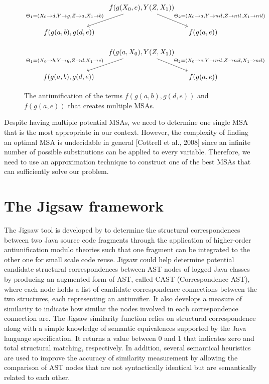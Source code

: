 \begin{figure} [H]
\[
\begin{tikzcd}[column sep=small]
&
  f(g(X_0,e),Y(Z,X_1))
  \arrow{dr}{\Theta_2 = ( X_0 \rightarrow a, Y \rightarrow nil, Z \rightarrow nil, X_1 \rightarrow nil) }
  \arrow[->,swap]{dl}{\Theta_1 = ( X_0 \rightarrow d, Y \rightarrow g, Z \rightarrow a, X_1 \rightarrow b)} %
\\
f(g(a,b), g(d,e))
&&
f(g(a,e))
\end{tikzcd}
\]	

\[
\begin{tikzcd}[column sep=small]
&
  f(g(a,X_0),Y(Z,X_1))
  \arrow{dr}{\Theta_2 = ( X_0 \rightarrow e, Y \rightarrow nil, Z \rightarrow nil, X_1 \rightarrow nil) }
  \arrow[->,swap]{dl}{\Theta_1 = ( X_0 \rightarrow b, Y \rightarrow g, Z \rightarrow d, X_1 \rightarrow e)} %
\\
f(g(a,b), g(d,e))
&&
f(g(a,e))
\end{tikzcd}
\]
  \caption{The antiunification of the terms $f(g(a,b), g(d,e))$
and $f(g(a,e))$ that creates multiple MSAs.}
  \label{fig:multipleMSA}
\end{figure}


Despite having multiple potential MSAs, we need to determine one single MSA that is the most appropriate in our context. However, the complexity of finding an optimal MSA is undecidable in general [Cottrell et al., 2008] since an infinite number of possible substitutions can be applied to every variable. Therefore, we need to use an approximation technique to construct one of the best MSAs that can sufficiently solve our problem.


\section{The Jigsaw framework}  \label{Jigsaw}
The Jigsaw tool is developed by \citet{2008:fse:cottrell} to determine the structural correspondences between two Java source code fragments through the application of higher-order antiunification modulo theories such that one fragment can be integrated to the other one for small scale code reuse. Jigsaw could help determine potential candidate structural correspondences between AST nodes of logged Java classes by producing an augmented form of AST, called CAST (Correspondence AST), where each node holds a list of candidate correspondence connections between the two structures, each representing an antiunifier. It also develops a measure of similarity to indicate how similar the nodes involved in each correspondence connection are. The Jigsaw similarity function relies on structural correspondence along with a simple knowledge of semantic equivalences supported by the Java language specification. It returns a value between 0 and 1 that indicates zero and total structural matching, respectively. In addition, several semantical heuristics are used to improve the accuracy of similarity measurement by allowing the comparison of AST nodes that are not syntactically identical but are semantically related to each other.

